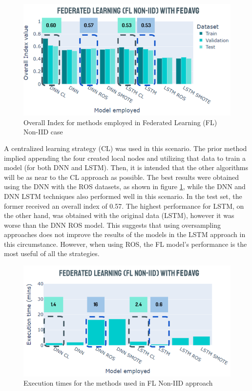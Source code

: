 \begin{figure}[H]
\centering
\includegraphics[scale=0.6]{img/fl_noniid_methods.png}
\caption{Overall Index for methods employed in Federated Learning (FL) Non-IID case}
\label{fig:fl_noniid_methods}
\end{figure}

A centralized learning strategy (CL) was used in this scenario. The prior method implied appending the four created local nodes and utilizing that data to train a model (for both DNN and LSTM). Then, it is intended that the other algorithms will be as near to the CL approach as possible. The best results were obtained using the DNN with the ROS datasets, as shown in figure \ref{fig:fl_noniid_methods}, while the DNN and DNN LSTM techniques also performed well in this scenario. In the test set, the former received an overall index of 0.57. The highest performance for LSTM, on the other hand, was obtained with the original data (LSTM), however it was worse than the DNN ROS model. This suggests that using oversampling approaches does not improve the results of the models in the LSTM approach in this circumstance. However, when using ROS, the FL model's performance is the most useful of all the strategies.

\begin{figure}[H]
\centering
\includegraphics[scale=0.6]{img/times_fl_noniid.png}
\caption{Execution times for the methods used in FL Non-IID approach}
\label{fig:times_fl_noniid}
\end{figure}

